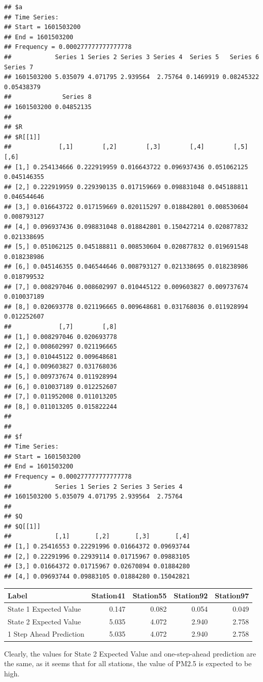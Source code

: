\documentclass[
]{article}
\begin{document}
\begin{verbatim}
## $a
## Time Series:
## Start = 1601503200 
## End = 1601503200 
## Frequency = 0.000277777777777778 
##            Series 1 Series 2 Series 3 Series 4  Series 5   Series 6   Series 7
## 1601503200 5.035079 4.071795 2.939564  2.75764 0.1469919 0.08245322 0.05438379
##              Series 8
## 1601503200 0.04852135
## 
## $R
## $R[[1]]
##             [,1]        [,2]        [,3]        [,4]        [,5]        [,6]
## [1,] 0.254134666 0.222919959 0.016643722 0.096937436 0.051062125 0.045146355
## [2,] 0.222919959 0.229390135 0.017159669 0.098831048 0.045188811 0.046544646
## [3,] 0.016643722 0.017159669 0.020115297 0.018842801 0.008530604 0.008793127
## [4,] 0.096937436 0.098831048 0.018842801 0.150427214 0.020877832 0.021338695
## [5,] 0.051062125 0.045188811 0.008530604 0.020877832 0.019691548 0.018238986
## [6,] 0.045146355 0.046544646 0.008793127 0.021338695 0.018238986 0.018799532
## [7,] 0.008297046 0.008602997 0.010445122 0.009603827 0.009737674 0.010037189
## [8,] 0.020693778 0.021196665 0.009648681 0.031768036 0.011928994 0.012252607
##             [,7]        [,8]
## [1,] 0.008297046 0.020693778
## [2,] 0.008602997 0.021196665
## [3,] 0.010445122 0.009648681
## [4,] 0.009603827 0.031768036
## [5,] 0.009737674 0.011928994
## [6,] 0.010037189 0.012252607
## [7,] 0.011952008 0.011013205
## [8,] 0.011013205 0.015822244
## 
## 
## $f
## Time Series:
## Start = 1601503200 
## End = 1601503200 
## Frequency = 0.000277777777777778 
##            Series 1 Series 2 Series 3 Series 4
## 1601503200 5.035079 4.071795 2.939564  2.75764
## 
## $Q
## $Q[[1]]
##            [,1]       [,2]       [,3]       [,4]
## [1,] 0.25416553 0.22291996 0.01664372 0.09693744
## [2,] 0.22291996 0.22939114 0.01715967 0.09883105
## [3,] 0.01664372 0.01715967 0.02670894 0.01884280
## [4,] 0.09693744 0.09883105 0.01884280 0.15042821
\end{verbatim}

\begin{longtable}[]{@{}lrrrr@{}}
\toprule()
Label & Station41 & Station55 & Station92 & Station97 \\
\midrule()
\endhead
State 1 Expected Value & 0.147 & 0.082 & 0.054 & 0.049 \\
State 2 Expected Value & 5.035 & 4.072 & 2.940 & 2.758 \\
1 Step Ahead Prediction & 5.035 & 4.072 & 2.940 & 2.758 \\
\bottomrule()
\end{longtable}

Clearly, the values for State 2 Expected Value and one-step-ahead
prediction are the same, as it seems that for all stations, the value of
PM2.5 is expected to be high.
\end{document}
